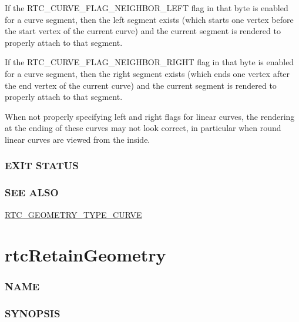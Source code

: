 If the RTC\_CURVE\_FLAG\_NEIGHBOR\_LEFT flag in that byte is enabled for
a curve segment, then the left segment exists (which starts one vertex
before the start vertex of the current curve) and the current segment is
rendered to properly attach to that segment.

If the RTC\_CURVE\_FLAG\_NEIGHBOR\_RIGHT flag in that byte is enabled
for a curve segment, then the right segment exists (which ends one
vertex after the end vertex of the current curve) and the current
segment is rendered to properly attach to that segment.

When not properly specifying left and right flags for linear curves, the
rendering at the ending of these curves may not look correct, in
particular when round linear curves are viewed from the inside.

\subsubsection{EXIT STATUS}\label{exit-status}

\subsubsection{SEE ALSO}\label{see-also}

\hyperref[rtc_geometry_type_curve]{RTC\_GEOMETRY\_TYPE\_CURVE}

\pagebreak

\section{rtcRetainGeometry}\label{rtcretaingeometry}

\subsubsection{NAME}\label{name}

\begin{Shaded}
\begin{Highlighting}[]
\OperatorTok{{-}}
\end{Highlighting}
\end{Shaded}

\subsubsection{SYNOPSIS}\label{synopsis}

\begin{Shaded}
\begin{Highlighting}[]

\OperatorTok{(}\OperatorTok{);}
\end{Highlighting}
\end{Shaded}

